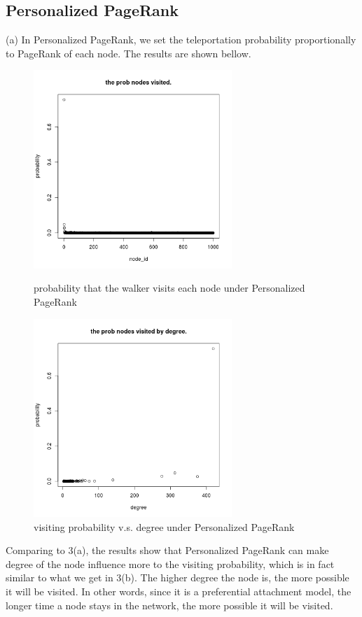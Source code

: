 \documentclass[draftcls,12pt,onecolumn]{IEEEtran}
\begin{document}
\subsection{Personalized PageRank}
(a) In Personalized PageRank, we set the teleportation probability proportionally to PageRank of each node. The results are shown bellow.
\begin{figure}[htbp]
\centering
\begin{minipage}[t]{0.48\textwidth}
\centering
\includegraphics[width=7.5cm]{4_a_rw_prob.png}
\caption{probability that the walker visits each node under Personalized PageRank}
\end{minipage}
\begin{minipage}[t]{0.48\textwidth}
\centering
\includegraphics[width=7.5cm]{4_a_rw_prob_by_degree.png}
\caption{visiting probability v.s. degree under Personalized PageRank}
\end{minipage}
\end{figure}
Comparing to 3(a), the results show that Personalized PageRank can make degree of the node influence more to the visiting probability, which is in fact similar to what we get in 3(b). The higher degree the node is, the more possible it will be visited. In other words, since it is a preferential attachment model, the longer time a node stays in the network, the more possible it will be visited. 
\end{document}
